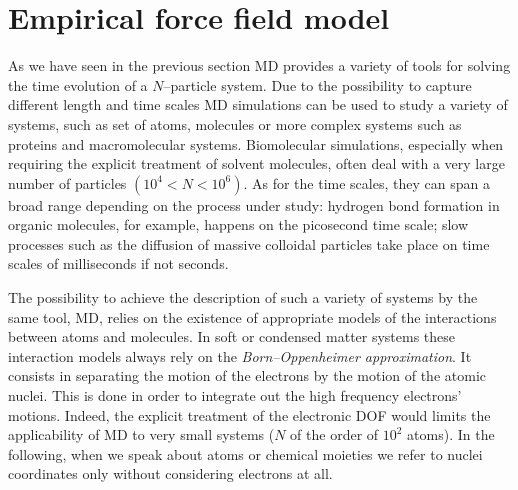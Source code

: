 \chapter{Empirical force field model}
\label{chap:EmpiricalFF}
As we have seen in the previous section \ac{MD} provides a variety of tools for solving the time evolution of a
$N$--particle system. Due to the possibility to capture different length and time scales \ac{MD} simulations can
be used to study a variety of systems, such as set of atoms, molecules or more complex systems such as proteins 
and macromolecular systems. Biomolecular simulations, especially when requiring the explicit treatment of 
solvent molecules, often deal with a very large number of particles $(10^4 < N < 10^6)$. As for the time scales, 
they can span a broad range depending on the process under study: hydrogen bond formation in organic molecules, 
for example, happens on the picosecond time scale; slow processes such as the diffusion of massive colloidal 
particles take place on time scales of milliseconds if not seconds.


The possibility to achieve the description of such a variety of systems by the same tool, \ac{MD}, relies on the 
existence of appropriate models of the interactions between atoms and molecules. In soft or condensed matter 
systems these interaction models always rely on the \textit{Born--Oppenheimer approximation}. It consists in 
separating the motion of the electrons by the motion of the atomic nuclei. This is done in order to integrate 
out the high frequency electrons' motions. Indeed, the explicit treatment of the electronic \ac{DOF} would 
limits the applicability of \ac{MD} to very small systems ($N$ of the order of $10^2$ atoms). In the following, 
when we speak about atoms or chemical moieties we refer to nuclei coordinates only without considering electrons 
at all.


